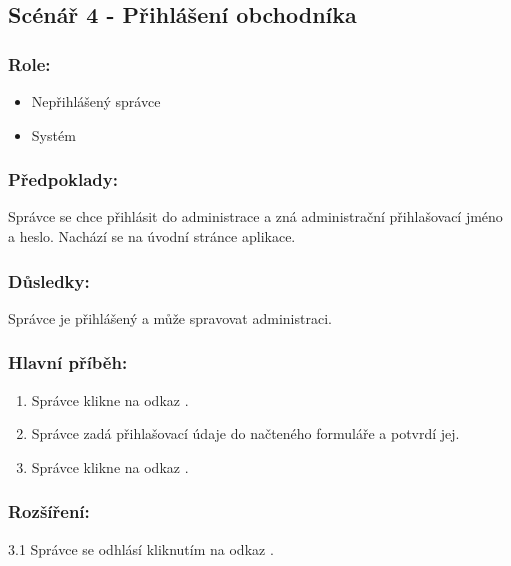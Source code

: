 \documentclass[11pt,twoside,a4paper]{book}
\begin{document}
\subsection{Scénář 4 - Přihlášení obchodníka}

\subsubsection*{Role:}

\begin{itemize}
\item Nepřihlášený správce
\item Systém
\end{itemize}

\subsubsection*{Předpoklady:}

Správce se chce přihlásit do administrace a zná administrační přihlašovací jméno a heslo. Nachází se na úvodní stránce aplikace.

\subsubsection*{Důsledky:}

Správce je přihlášený a může spravovat administraci.


\subsubsection*{Hlavní příběh:}

\begin{enumerate}
\item Správce klikne na odkaz .
\item Správce zadá přihlašovací údaje do načteného formuláře a potvrdí jej.
\item Správce klikne na odkaz .
\end{enumerate}

\subsubsection*{Rozšíření:}

\begin{description}
\item 3.1 Správce se odhlásí kliknutím na odkaz .
\end{description}
\end{document}
